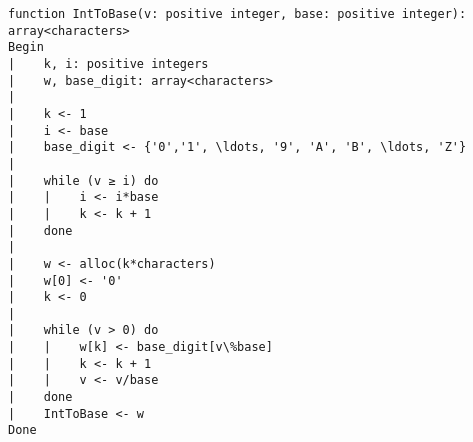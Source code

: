 \begin{lstlisting}[breaklines]
function IntToBase(v: positive integer, base: positive integer): array<characters>
Begin
|    k, i: positive integers
|    w, base_digit: array<characters>
|
|    k <- 1
|    i <- base
|    base_digit <- {'0','1', \ldots, '9', 'A', 'B', \ldots, 'Z'}
|    
|    while (v ≥ i) do
|    |    i <- i*base
|    |    k <- k + 1
|    done
|
|    w <- alloc(k*characters)
|    w[0] <- '0'
|    k <- 0
|
|    while (v > 0) do
|    |    w[k] <- base_digit[v\%base]
|    |    k <- k + 1
|    |    v <- v/base
|    done
|    IntToBase <- w
Done
\end{lstlisting}
